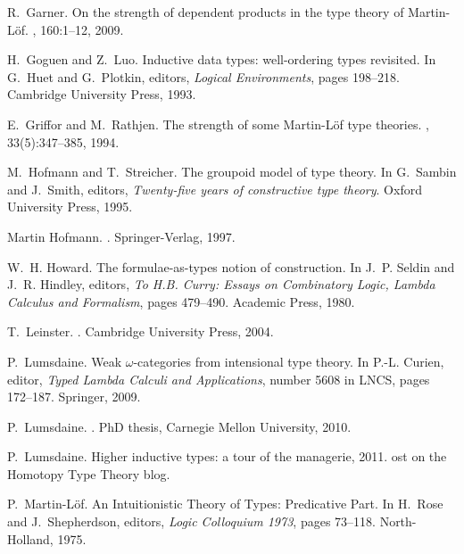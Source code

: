 \documentclass{article}
\theoremstyle{remark}
\theoremstyle{definition}
\begin{document}
\begin{thebibliography}{10}
R.~Garner.
\newblock On the strength of dependent products in the type theory of
  {M}artin-{L}\"of.
, 160:1--12, 2009.

H.~Goguen and Z.~Luo.
\newblock Inductive data types: well-ordering types revisited.
\newblock In G.~Huet and G.~Plotkin, editors, {\em Logical Environments}, pages
  198--218. Cambridge University Press, 1993.

E.~Griffor and M.~Rathjen.
\newblock The strength of some {M}artin-{L}\"of type theories.
, 33(5):347--385, 1994.

M.~Hofmann and T.~Streicher.
\newblock The groupoid model of type theory.
\newblock In G.~Sambin and J.~Smith, editors, {\em Twenty-five years of
  constructive type theory}. Oxford University Press, 1995.

Martin Hofmann.
.
\newblock Springer-Verlag, 1997.

W.~H. Howard.
\newblock The formulae-as-types notion of construction.
\newblock In J.~P. Seldin and J.~R. Hindley, editors, {\em To {H}.{B}. {C}urry:
  {E}ssays on {C}ombinatory {L}ogic, {L}ambda {C}alculus and {F}ormalism},
  pages 479--490. Academic Press, 1980.

T.~Leinster.
.
\newblock Cambridge University Press, 2004.

P.~Lumsdaine.
\newblock Weak $\omega$-categories from intensional type theory.
\newblock In P.-L. Curien, editor, {\em Typed Lambda Calculi and Applications},
  number 5608 in LNCS, pages 172--187. Springer, 2009.

P.~Lumsdaine.
.
\newblock PhD thesis, Carnegie Mellon University, 2010.

P.~Lumsdaine.
\newblock Higher inductive types: a tour of the managerie, 2011.
ost on the Homotopy Type Theory blog.

P.~Martin-L{\"o}f.
\newblock An {I}ntuitionistic {T}heory of {T}ypes: {P}redicative {P}art.
\newblock In H.~Rose and J.~Shepherdson, editors, {\em Logic Colloquium 1973},
  pages 73--118. North-Holland, 1975.


\end{thebibliography}
\end{document}
